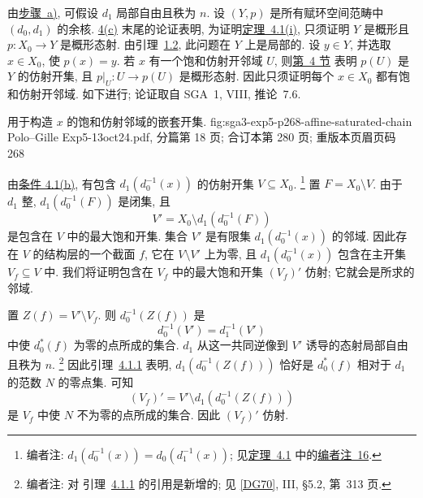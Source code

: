 
\label{proof:sga3-V-5-b-general}%
由\hyperref[par:sga3-V-5-a]{步骤~a)}, 可假设 \(d_1\) 局部自由且秩为 \(n\).
设 \((Y,p)\) 是所有赋环空间范畴中 \((d_0,d_1)\) 的余核.
\hyperref[proof:sga3-V-4.1-c]{4(c)} 末尾的论证表明,
为证明\hyperref[thm:sga3-V-4.1-i]{定理~4.1(i)},
只须证明 \(Y\) 是概形且 \(p:X_0\to Y\) 是概形态射.
由引理~\hyperref[sga3:exp5:lemma:1.2]{1.2}, 此问题在 \(Y\) 上是局部的.
设 \(y\in Y\), 并选取 \(x\in X_0\), 使 \(p(x)=y\).
若 \(x\) 有一个饱和仿射开邻域 \(U\), 则\hyperref[sec:sga3-V-4]{第~4 节}
表明 \(p(U)\) 是 \(Y\) 的仿射开集,
且 \(p|_U:U\to p(U)\) 是概形态射.
因此只须证明每个 \(x\in X_0\) 都有饱和仿射开邻域.
如下进行; 论证取自 SGA~1, VIII, 推论~7.6.

  {用于构造 \(x\) 的饱和仿射邻域的嵌套开集.}
  {fig:sga3-exp5-p268-affine-saturated-chain}
  {Polo--Gille Exp5-13oct24.pdf, 分篇第 18 页;
  合订本第 280 页; 重版本页眉页码 268}

由\hyperref[thm:sga3-V-4.1-b]{条件 4.1(b)},
有包含 \(d_1(d_0^{-1}(x))\) 的仿射开集 \(V\subseteq X_0\).%
\footnote{\label{note:sga3-V-28}编者注:
\(d_1(d_0^{-1}(x))=d_0(d_1^{-1}(x))\);
见\hyperref[thm:sga3-V-4.1]{定理~4.1} 中的\hyperref[note:sga3-V-16]{编者注~16}.}
置 \(F=X_0\setminus V\). 由于 \(d_1\) 整,
\(d_1(d_0^{-1}(F))\) 是闭集, 且
\[
  V'=X_0\setminus d_1(d_0^{-1}(F))
\]
是包含在 \(V\) 中的最大饱和开集.
集合 \(V'\) 是有限集 \(d_1(d_0^{-1}(x))\) 的邻域.
因此存在 \(V\) 的结构层的一个截面 \(f\), 它在
\(V\setminus V'\) 上为零, 且 \(d_1(d_0^{-1}(x))\)
包含在主开集 \(V_f\subseteq V\) 中.
我们将证明包含在 \(V_f\) 中的最大饱和开集 \((V_f)'\) 仿射;
它就会是所求的邻域.

置 \(Z(f)=V'\setminus V_f\). 则 \(d_0^{-1}(Z(f))\)
是
\[
  d_0^{-1}(V')=d_1^{-1}(V')
\]
中使 \(d_0^\ast(f)\) 为零的点所成的集合.
\(d_1\) 从这一共同逆像到 \(V'\) 诱导的态射局部自由且秩为 \(n\).%
\footnote{\label{note:sga3-V-29}编者注: 对
引理~\hyperref[lem:sga3-V-4.1.1]{4.1.1} 的引用是新增的;
见 \hyperref[bib:sga3-V-DG70]{[DG70]}, III, \S5.2, 第~313 页.}
因此引理~\hyperref[lem:sga3-V-4.1.1]{4.1.1} 表明,
\(d_1(d_0^{-1}(Z(f)))\) 恰好是 \(d_0^\ast(f)\)
相对于 \(d_1\) 的范数 \(N\) 的零点集. 可知
\[
  (V_f)'=V'\setminus d_1(d_0^{-1}(Z(f)))
\]
是 \(V_f\) 中使 \(N\) 不为零的点所成的集合.
因此 \((V_f)'\) 仿射.

